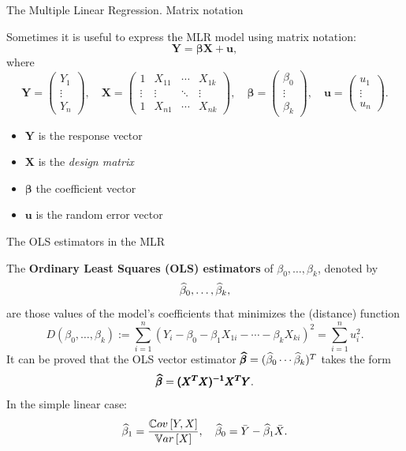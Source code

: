 \documentclass[aspectratio=169]{beamer}
\begin{document}
\begin{frame}{The Multiple Linear Regression. Matrix notation}

Sometimes it is useful to express the MLR model using matrix notation:
$$
\pmb{Y = \beta X + u},
$$
where
$$
\pmb{Y} = 
\begin{pmatrix}
Y_1 \\ \vdots \\ Y_n    
\end{pmatrix},\quad
\pmb{X} = 
\begin{pmatrix}
1 & X_{11} & \cdots & X_{1k} \\
\vdots & \vdots & \ddots & \vdots \\
1 & X_{n1} & \cdots & X_{nk}
\end{pmatrix},\quad
\pmb{\beta} = 
\begin{pmatrix}
\beta_0 \\ \vdots \\ \beta_k    
\end{pmatrix},\quad
\pmb{u} = 
\begin{pmatrix}
u_1 \\ \vdots \\ u_n    
\end{pmatrix}.
$$

\begin{itemize}

    \item $\pmb{Y}$ is the response vector

    \item $\pmb{X}$ is the \textit{design matrix}

    \item $\pmb{\beta}$ the coefficient vector

    \item $\pmb{u}$ is the random error vector
    
\end{itemize}

\end{frame}

\begin{frame}{The OLS estimators in the MLR}

The \textbf{Ordinary Least Squares (OLS) estimators} of $\beta_0, \ldots, \beta_k$, denoted by
$$
\widehat{\beta}_0,\ldots,\widehat{\beta}_k,
$$
are those values of the model's coefficients that minimizes the (distance) function
$$
D(\beta_0,\ldots, \beta_k) := \sum_{i=1}^{n}(Y_i - \beta_0 - \beta_1X_{1i} - \cdots - \beta_kX_{ki})^2 = \sum_{i=1}^{n}u_i^2.
$$
It can be proved that the OLS vector estimator $\pmb{\widehat{\beta}} = (\widehat{\beta}_0 \cdots \widehat{\beta}_k)^T$ takes the form
$$
\pmb{\widehat{\beta}} = \pmb{(X^TX)^{-1}X^TY}. 
$$
In the simple linear case:
$$
\widehat{\beta}_1 = \frac{\mathbb{C}ov\left[ Y, X\right]}{\mathbb{V}ar\left[ X\right]}, \quad \widehat{\beta}_0 = \bar{Y} - \widehat{\beta}_1 \bar{X}.
$$

\end{frame}
\end{document}
